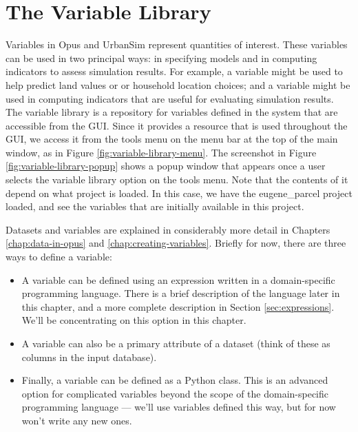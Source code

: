 \chapter{The Variable Library}
\label{chap:variable-library}

Variables in Opus and UrbanSim represent quantities of interest.  These
variables can be used in two principal ways: in specifying models and in
computing indicators to assess simulation results.  For example, a
 variable might be used to help predict land
values or or household location choices; and a 
variable might be used in computing indicators that are useful for
evaluating simulation results.  The variable library is a repository for
variables defined in the system that are accessible from the GUI\@.  Since
it provides a resource that is used throughout the GUI, we access it from
the tools menu on the menu bar at the top of the main window, as in Figure
\ref{fig:variable-library-menu}.  The screenshot in Figure
\ref{fig:variable-library-popup} shows a popup window that appears once a
user selects the variable library option on the tools menu.  Note that the
contents of it depend on what project is loaded.  In this case, we have the
eugene\_parcel project loaded, and see the variables that are initially
available in this project.

Datasets and variables are explained in considerably more detail in
Chapters \ref{chap:data-in-opus} and \ref{chap:creating-variables}.
Briefly for now, there are three ways to define a variable:

\begin{itemize}

\item A variable can be defined using an expression written in a
  domain-specific programming language.  There is a brief description of
  the language later in this chapter, and a more complete description in
  Section \ref{sec:expressions}.  We'll be concentrating on this option in
  this chapter.

\item A variable can also be a primary attribute of a dataset (think of
  these as columns in the input database).

\item Finally, a variable can be defined as a Python class.  This is an
  advanced option for complicated variables beyond the scope of the
  domain-specific programming language --- we'll use variables defined this
  way, but for now won't write any new ones.

\end{itemize}

